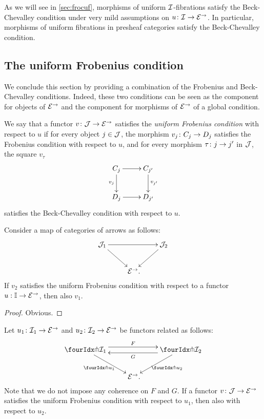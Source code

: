 \documentclass[reqno,10pt,a4paper,oneside,draft]{amsart}
\begin{document}
As we will see in \cref{sec:frocuf}, morphisms of uniform $\cal{I}$-fibrations satisfy the Beck-Chevalley condition under very mild assumptions on $u \co \cal{I} \to \catE^\to$.
In particular, morphisms of uniform fibrations in presheaf categories satisfy the Beck-Chevalley condition.

\subsection*{The uniform Frobenius condition}

We conclude this section by providing a combination of the Frobenius and Beck-Chevalley conditions.
Indeed, these two conditions can be seen as the component for objects of $\catE^\to$ and the component for morphisms of $\catE^\to$ of a global condition.

\begin{definition}
We say that a functor $v \co \cal{J} \to \catE^\to$ satisfies the \emph{uniform Frobenius condition} with respect to $u$ if for every object $j \in \cal{J}$, the morphism $v_j \co C_j \to D_j$ satisfies the Frobenius condition with respect to $u$, and for every morphism $\tau \co j \to j'$ in $\cal{J}$, the square $v_\tau$
\[
\xymatrix{
C_j \ar[r] \ar[d]_{v_j} & C_{j'} \ar[d]^{v_{j'}} \\
D_j \ar[r] & D_{j'}}
\]
satisfies the Beck-Chevalley condition with respect to $u$.
\end{definition}

\begin{proposition} \label{uniform-frobenius-change-v}
Consider a map of categories of arrows as follows:
\[
\xymatrix{
  \cal{J}_1
  \ar[rr]
  \ar[dr]
&&
  \cal{J}_2
  \ar[dl]
\\&
  \catE^\to
\rlap{.}}
\]
If $v_2$ satisfies the uniform Frobenius condition with respect to a functor $u : \cat{I} \to \catE^\to$, then also $v_1$.
\end{proposition}

\begin{proof}
Obvious.
\end{proof}

\begin{proposition} \label{uniform-frobenius-change-u}
Let $u_1 \co \cal{I}_1 \to \catE^\to$ and $u_2 \co \cal{I}_2 \to \catE^\to$ be functors related as follows:
\[
\xymatrix{
  \liftr{\cal{I}_1}
  \ar@<4pt>[rr]^{F}
  \ar[dr]_{\liftr{u_1}}
&&
  \liftr{\cal{I}_2}
  \ar@<4pt>[ll]^{G}
  \ar[dl]^{\liftr{u_2}}
\\&
  \catE^\to
\rlap{.}}
\]
Note that we do not impose any coherence on $F$ and $G$.
If a functor $v \co \cal{J} \to \catE^\to$ satisfies the uniform Frobenius condition with respect to $u_1$, then also with respect to $u_2$.
\end{proposition}
\end{document}
